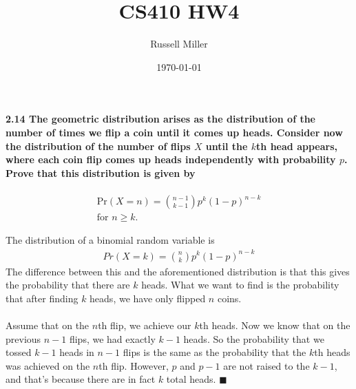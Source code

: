 \documentclass{article}
\title{CS410 HW4}
\author{Russell Miller}
\date{\today}
\begin{document}
\maketitle


\paragraph{2.14 The geometric distribution arises as the distribution of the 
number of times we flip a coin until it comes up heads. Consider now the 
distribution of the number of flips $X$ until the $k$th head appears, where 
each coin flip comes up heads independently with probability $p$. Prove that 
this distribution is given by}
\begin{eqnarray*}
\mbox{Pr}(X=n)={n-1 \choose k-1}p^k(1-p)^{n-k}\\
\mbox{for } n \geq k.
\end{eqnarray*}

The distribution of a binomial random variable is
\begin{eqnarray*}
Pr(X=k)={n\choose k}p^k(1-p)^{n-k}
\end{eqnarray*}
The difference between this and the aforementioned distribution is that this 
gives the probability that there are $k$ heads. What we want to find is the 
probability that after finding $k$ heads, we have only flipped $n$ coins.\\
\\
Assume that on the $n$th flip, we achieve our $k$th heads. Now we know that on 
the previous $n-1$ flips, we had exactly $k-1$ heads. So the probability that 
we tossed $k-1$ heads in $n-1$ flips is the same as the probability that the 
$k$th heads was achieved on the $n$th flip. However, $p$ and $p-1$ are not 
raised to the $k-1$, and that's because there are in fact $k$ total heads. 
$\blacksquare$
\end{document}
